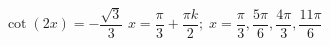 { $\cot \left( 2x \right) = -\dfrac{\sqrt{3}}{3}$}
{ $x = \dfrac{\pi}{3} + \dfrac{\pi k}{2}; \; x = \dfrac{\pi}{3}, \dfrac{5\pi}{6}, \dfrac{4\pi}{3}, \dfrac{11\pi}{6}$}
